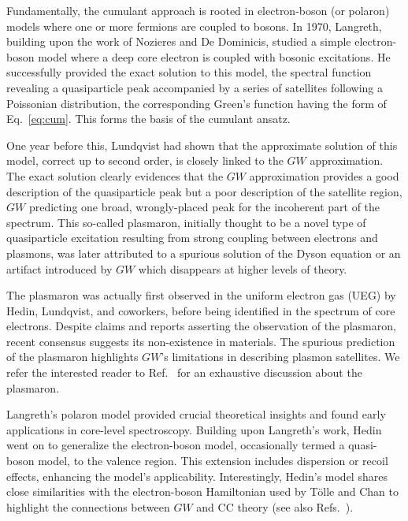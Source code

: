 \documentclass[aip,jcp,reprint,noshowkeys,superscriptaddress]{revtex4-2}
\begin{document}
Fundamentally, the cumulant approach is rooted in electron-boson (or polaron) models where one or more fermions are coupled to bosons. In 1970, Langreth, \cite{Langreth_1970} building upon the work of Nozieres and De Dominicis, \cite{Nozieres_1969} studied a simple electron-boson model where a deep core electron is coupled with bosonic excitations. He successfully provided the exact solution to this model, the spectral function revealing a quasiparticle peak accompanied by a series of satellites following a Poissonian distribution, the corresponding Green's function having the form of Eq.~\eqref{eq:cum}. \cite{Langreth_1970}
This forms the basis of the cumulant ansatz.

One year before this, Lundqvist had shown that the approximate solution of this model, correct up to second order, is closely linked to the $GW$ approximation. \cite{Lundqvist_1969} The exact solution clearly evidences that the $GW$ approximation provides a good description of the quasiparticle peak but a poor description of the satellite region, $GW$ predicting one broad, wrongly-placed peak for the incoherent part of the spectrum. This so-called plasmaron, initially thought to be a novel type of quasiparticle excitation resulting from strong coupling between electrons and plasmons, \cite{Lundqvist_1969} was later attributed to a spurious solution of the Dyson equation or an artifact introduced by $GW$ which disappears at higher levels of theory. 

The plasmaron was actually first observed in the uniform electron gas (UEG) by Hedin, Lundqvist, and coworkers, \cite{Hedin_1967,Lundqvist_1967a,Lundqvist_1967b,Lundqvist_1968,Lundqvist_1969a} before being identified in the spectrum of core electrons. \cite{Lundqvist_1969} Despite claims and reports asserting the observation of the plasmaron, \cite{Bostwick_2010,Dial_2012} recent consensus suggests its non-existence in materials. The spurious prediction of the plasmaron highlights $GW$'s limitations in describing plasmon satellites. We refer the interested reader to Ref.~ for an exhaustive discussion about the plasmaron.

Langreth's polaron model provided crucial theoretical insights and found early applications in core-level spectroscopy. Building upon Langreth's work, Hedin \cite{Hedin_1980,Hedin_1991,Hedin_1999} went on to generalize the electron-boson model, occasionally termed a quasi-boson model, to the valence region. This extension includes dispersion or recoil effects, enhancing the model's applicability. Interestingly, Hedin's model shares close similarities with the electron-boson Hamiltonian used by T\"olle and Chan \cite{Tolle_2023} to highlight the connections between $GW$ and CC theory (see also Refs.~). 
\end{document}
